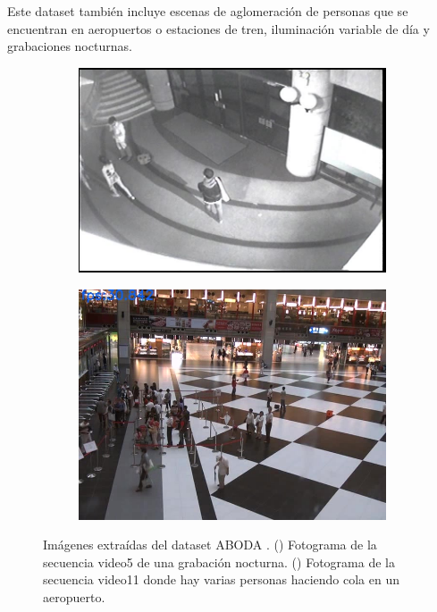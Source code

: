 Este dataset también incluye escenas de aglomeración de personas que se encuentran en aeropuertos o estaciones de tren, iluminación variable de día y grabaciones nocturnas.

\begin{figure}[ht]
  \centering
  \begin{subfigure}[b]{0.4\textwidth}
    \includegraphics[width=\textwidth]{img/chapters/resultados/datasets/aboda_3.jpg}
    \caption{}
    \label{fig:aboda_3}
  \end{subfigure}
  \qquad\qquad
  \begin{subfigure}[b]{0.4\textwidth}
    \includegraphics[width=\textwidth]{img/chapters/resultados/datasets/aboda_4.jpg}
    \caption{}
    \label{fig:aboda_4}
  \end{subfigure}
  \caption{Imágenes extraídas del dataset ABODA \cite{aboda-dataset}.
    (\protect{}) Fotograma de la secuencia video5 de una grabación nocturna.
    (\protect{}) Fotograma de la secuencia video11 donde hay varias personas haciendo cola en un aeropuerto.}
  \label{fig:aboda2}
\end{figure}

